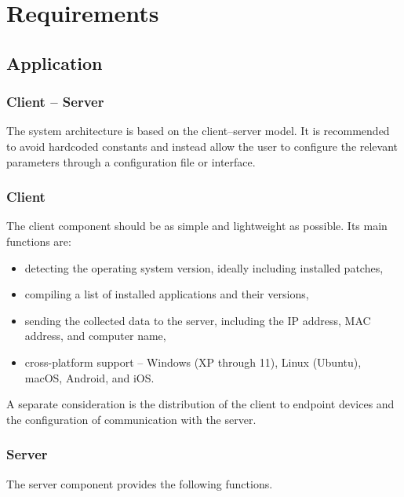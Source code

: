\chapter{Requirements} 

\section{Application}

\subsection{Client -- Server}

The system architecture is based on the client--server model.
It is recommended to avoid hardcoded constants and instead allow the user to configure the relevant parameters through a configuration file or interface.

\subsection{Client}

The client component should be as simple and lightweight as possible.
Its main functions are:

\begin{itemize}
    \item detecting the operating system version, ideally including installed patches,
    \item compiling a list of installed applications and their versions,
    \item sending the collected data to the server, including the IP address, MAC address, and computer name,
    \item cross-platform support -- Windows (XP through 11), Linux (Ubuntu), macOS, Android, and iOS.
\end{itemize}

A separate consideration is the distribution of the client to endpoint devices and the configuration of communication with the server.

\subsection{Server}

The server component provides the following functions.

